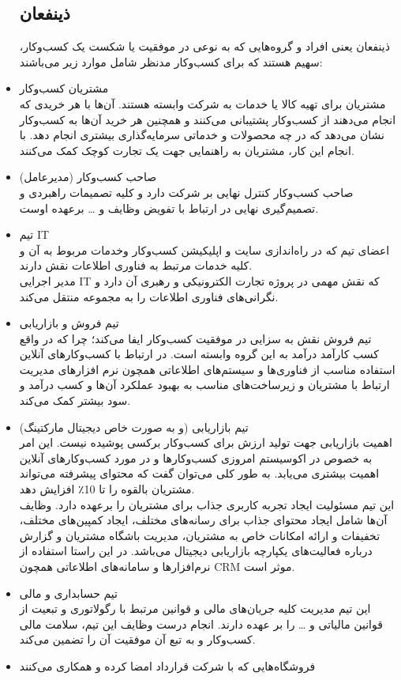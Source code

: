 \documentclass[14pt]{article}
\begin{document}
\begin{flushright}
\begin{itemize}
\subsection{ ذینفعان}
ذینفعان یعنی افراد و گروه‌هایی که به نوعی در موفقیت یا شکست یک کسب‌وکار، سهیم هستند که برای کسب‌وکار مدنظر شامل موارد زیر می‌باشند:\\
\item مشتریان کسب‌و‌کار‌ \\
مشتریان برای تهیه کالا یا خدمات به شرکت وابسته هستند. آن‌ها با هر خریدی که انجام می‌دهند از کسب‌وکار پشتیبانی می‌کنند و همچنین هر خرید آن‌ها به کسب‌وکار نشان می‌دهد که در چه محصولات و خدماتی سرمایه‌گذاری بیشتری انجام دهد. با انجام این کار، مشتریان به راهنمایی جهت یک تجارت کوچک کمک می‌کنند.
\item صاحب کسب‌وکار (مدیرعامل)\\
صاحب کسب‌وکار کنترل نهایی بر شرکت دارد و کلیه تصمیمات راهبردی و تصمیم‌گیری نهایی در ارتباط با تفویض وظایف و … برعهده اوست.\\
\item تیم IT \\
 اعضای تیم که در راه‌اندازی سایت و اپلیکیشن کسب‌وکار وخدمات مربوط به آن و کلیه خدمات مرتبط به فناوری اطلاعات نقش دارند.\\
مدیر اجرایی IT که نقش مهمی در پروژه تجارت الکترونیکی و رهبری آن دارد و نگرانی‌های فناوری اطلاعات را به مجموعه منتقل می‌کند. \\
\item تیم فروش و بازاریابی\\
تیم فروش نقش به سزایی در موفقیت کسب‌وکار ایفا می‌کند؛ چرا که در واقع کسب کارآمد درآمد به این گروه وابسته است. در ارتباط با کسب‌وکارهای آنلاین استفاده مناسب از فناوری‌ها و سیستم‌های اطلاعاتی همچون نرم افزارهای مدیریت ارتباط با مشتریان   و زیرساخت‌های مناسب به بهبود عملکرد آن‌ها و کسب درآمد و سود بیشتر کمک می‌کند.\\
\item تیم بازاریابی (و به صورت خاص دیجیتال مارکتینگ)\\
اهمیت بازاریابی جهت تولید ارزش برای کسب‌وکار برکسی پوشیده نیست. این امر به خصوص در اکوسیستم امروزی کسب‌وکارها و در مورد کسب‌وکارهای آنلاین اهمیت بیشتری می‌یابد. به طور کلی می‌توان گفت که محتوای پیشرفته می‌تواند مشتریان بالقوه را تا 10٪ افزایش دهد.\\
این تیم مسئولیت ایجاد تجربه کاربری جذاب برای مشتریان را برعهده دارد. وظایف آن‌ها شامل ایجاد محتوای جذاب برای رسانه‌های مختلف، ایجاد کمپین‌های مختلف، تخفیفات و ارائه امکانات خاص به مشتریان، مدیریت باشگاه مشتریان و گزارش درباره فعالیت‌های یکپارچه بازاریابی دیجیتال می‌باشد. در این راستا استفاده از نرم‌افزارها و سامانه‌های اطلاعاتی همچون CRM موثر است.\\
\item تیم حسابداری و مالی\\ 
این تیم مدیریت کلیه جریان‌های مالی و قوانین مرتبط با رگولاتوری و تبعیت از قوانین مالیاتی و … را بر عهده دارند. انجام درست وظایف این تیم، ‌سلامت مالی کسب‌وکار و به تبع آن موفقیت آن را تضمین می‌کند.\\
\item فروشگاه‌هایی که با شرکت قرارداد امضا کرده و همکاری می‌کنند \\


\end{itemize}
\end{flushright}
\end{document}
